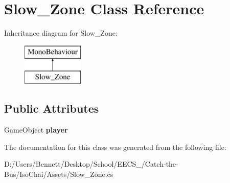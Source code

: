 \hypertarget{class_slow___zone}{}\section{Slow\+\_\+\+Zone Class Reference}
\label{class_slow___zone}
Inheritance diagram for Slow\+\_\+\+Zone\+:\begin{figure}[H]
\begin{center}
\leavevmode
\includegraphics[height=2.000000cm]{class_slow___zone}
\end{center}
\end{figure}
\subsection*{Public Attributes}
\begin{DoxyCompactItemize}
\item 
\mbox{\label{class_slow___zone_adc52e9697307dd2e40bbd352a48758a1}} 
Game\+Object {\bfseries player}
\end{DoxyCompactItemize}


The documentation for this class was generated from the following file\+:\begin{DoxyCompactItemize}
\item 
D\+:/\+Users/\+Bennett/\+Desktop/\+School/\+E\+E\+C\+S\+\_/\+Catch-\/the-\/\+Bus/\+Iso\+Chai/\+Assets/Slow\+\_\+\+Zone.\+cs\end{DoxyCompactItemize}

